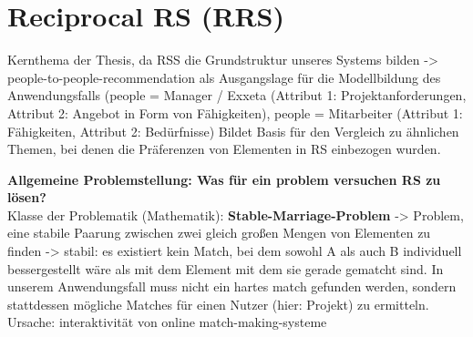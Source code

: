 
\section{Reciprocal RS (RRS)}
Kernthema der Thesis, da RSS die Grundstruktur unseres Systems bilden
-> people-to-people-recommendation als Ausgangslage für die Modellbildung des Anwendungsfalls (people = Manager / Exxeta (Attribut 1: Projektanforderungen, Attribut 2: Angebot in Form von Fähigkeiten), people = Mitarbeiter (Attribut 1: Fähigkeiten, Attribut 2: Bedürfnisse)
Bildet Basis für den Vergleich zu ähnlichen Themen, bei denen die Präferenzen von Elementen in RS einbezogen wurden.

\textbf{Allgemeine Problemstellung: Was für ein problem versuchen RS zu lösen?}\\
Klasse der Problematik (Mathematik): \textbf{Stable-Marriage-Problem} -> Problem, eine stabile Paarung zwischen zwei gleich großen Mengen von Elementen zu finden -> stabil: es existiert kein Match, bei dem sowohl A als auch B individuell bessergestellt wäre als mit dem Element mit dem sie gerade gematcht sind.%
In unserem Anwendungsfall muss nicht ein hartes match gefunden werden, sondern stattdessen mögliche Matches für einen Nutzer (hier: Projekt) zu ermitteln. Ursache: interaktivität von online match-making-systeme %



